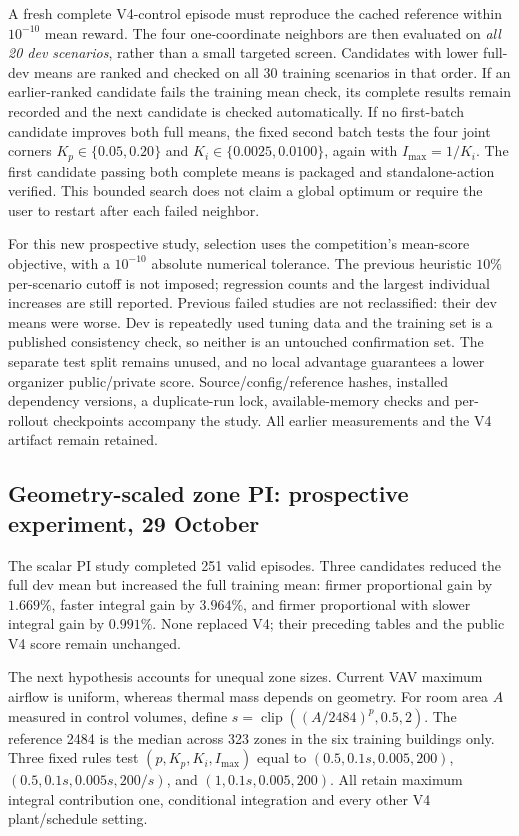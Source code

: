 A fresh complete V4-control episode must reproduce the cached reference
within $10^{-10}$ mean reward. The four one-coordinate neighbors are then
evaluated on \emph{all 20 dev scenarios}, rather than a small targeted screen.
Candidates with lower full-dev means are ranked and checked on all 30 training
scenarios in that order. If an earlier-ranked candidate fails the training
mean check, its complete results remain recorded and the next candidate is
checked automatically. If no first-batch candidate improves both full means,
the fixed second batch tests the four joint corners
$K_p\in\{0.05,0.20\}$ and $K_i\in\{0.0025,0.0100\}$, again with
$I_{\max}=1/K_i$. The first candidate passing both complete means is packaged
and standalone-action verified. This bounded search does not claim a global
optimum or require the user to restart after each failed neighbor.

For this new prospective study, selection uses the competition's mean-score
objective, with a $10^{-10}$ absolute numerical tolerance. The previous
heuristic $10\%$ per-scenario cutoff is not imposed; regression counts and the
largest individual increases are still reported. Previous failed studies are
not reclassified: their dev means were worse. Dev is repeatedly used tuning
data and the training set is a published consistency check, so neither is an
untouched confirmation set. The separate test split remains unused, and no
local advantage guarantees a lower organizer public/private score.
Source/config/reference hashes, installed dependency versions, a duplicate-run
lock, available-memory checks and per-rollout checkpoints accompany the study.
All earlier measurements and the V4 artifact remain retained.



\subsection{Geometry-scaled zone PI: prospective experiment, 29 October}
The scalar PI study completed 251 valid episodes. Three candidates reduced
the full dev mean but increased the full training mean: firmer proportional
gain by $1.669\%$, faster integral gain by $3.964\%$, and firmer proportional
with slower integral gain by $0.991\%$. None replaced V4; their preceding
tables and the public V4 score remain unchanged.

The next hypothesis accounts for unequal zone sizes. Current VAV maximum
airflow is uniform, whereas thermal mass depends on geometry. For room area
$A$ measured in control volumes, define
$s=\operatorname{clip}((A/2484)^p,0.5,2)$.
The reference 2484 is the median across 323 zones in the six training
buildings only. Three fixed rules test $(p,K_p,K_i,I_{\max})$ equal to
$(0.5,0.1s,0.005,200)$, $(0.5,0.1s,0.005s,200/s)$, and
$(1,0.1s,0.005,200)$. All retain maximum integral contribution one,
conditional integration and every other V4 plant/schedule setting.

